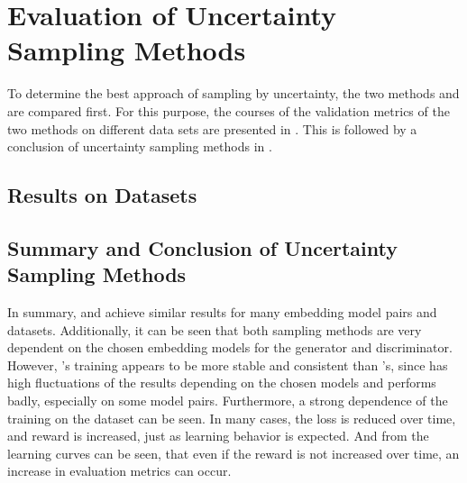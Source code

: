 \section{Evaluation of Uncertainty Sampling Methods}
\label{ch:evaluation:sec:evaluation_methods}
%
To determine the best approach of sampling by uncertainty, the two methods \usmax and \ussoftmax are compared first.
For this purpose, the courses of the validation metrics of the two methods on different data sets are presented in .
This is followed by a conclusion of uncertainty sampling methods in  .
%
\subsection{Results on Datasets} \label{subsec:methods_results}














%
\subsection{Summary and Conclusion of Uncertainty Sampling Methods} 
\label{subsec:methods_conclusion}
In summary, \usmax and \ussoftmax achieve similar results for many embedding model pairs and datasets.
Additionally, it can be seen that both sampling methods are very dependent on the chosen embedding models for the generator and discriminator.
However, \ussoftmax's training appears to be more stable and consistent than \usmax's, since \usmax has high fluctuations of the results depending on the chosen models and performs badly, especially on some model pairs.
Furthermore, a strong dependence of the training on the dataset can be seen.
In many cases, the loss is reduced over time, and reward is increased, just as learning behavior is expected.
And from the learning curves can be seen, that even if the reward is not increased over time, an increase in evaluation metrics can occur.

